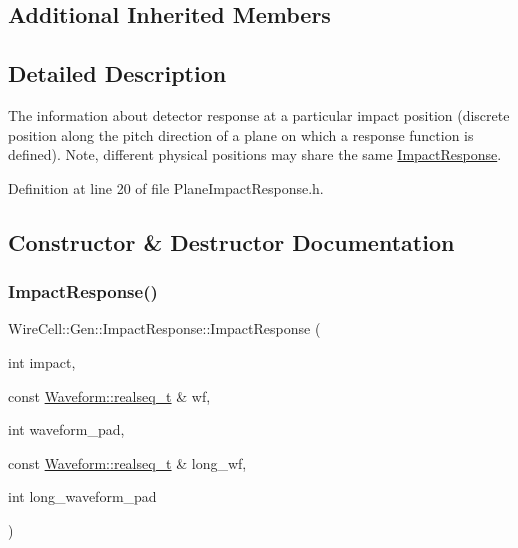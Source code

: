 \subsection*{Additional Inherited Members}


\subsection{Detailed Description}
The information about detector response at a particular impact position (discrete position along the pitch direction of a plane on which a response function is defined). Note, different physical positions may share the same \hyperlink{class_wire_cell_1_1_gen_1_1_impact_response}{Impact\+Response}. 

Definition at line 20 of file Plane\+Impact\+Response.\+h.



\subsection{Constructor \& Destructor Documentation}
\mbox{\label{class_wire_cell_1_1_gen_1_1_impact_response_ad10810e7b4dfbc2ab17cd79ff3b962f5}} 
\subsubsection{\texorpdfstring{Impact\+Response()}{ImpactResponse()}}
{\footnotesize\ttfamily Wire\+Cell\+::\+Gen\+::\+Impact\+Response\+::\+Impact\+Response (\begin{DoxyParamCaption}\item[{int}]{impact,  }\item[{const \hyperlink{namespace_wire_cell_1_1_waveform_a479175e541c8545e87cd8063b74b6956}{Waveform\+::realseq\+\_\+t} \&}]{wf,  }\item[{int}]{waveform\+\_\+pad,  }\item[{const \hyperlink{namespace_wire_cell_1_1_waveform_a479175e541c8545e87cd8063b74b6956}{Waveform\+::realseq\+\_\+t} \&}]{long\+\_\+wf,  }\item[{int}]{long\+\_\+waveform\+\_\+pad }\end{DoxyParamCaption})\hspace{0.3cm}{\ttfamily [inline]}}



